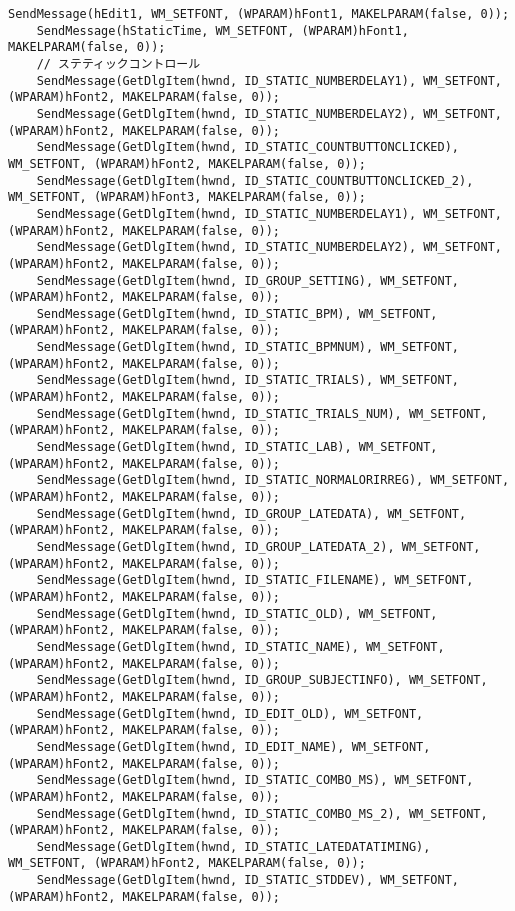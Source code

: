 \begin{lstlisting}[caption=main.cpp]
	SendMessage(hEdit1, WM_SETFONT, (WPARAM)hFont1, MAKELPARAM(false, 0));
	SendMessage(hStaticTime, WM_SETFONT, (WPARAM)hFont1, MAKELPARAM(false, 0));
	// ステティックコントロール
	SendMessage(GetDlgItem(hwnd, ID_STATIC_NUMBERDELAY1), WM_SETFONT, (WPARAM)hFont2, MAKELPARAM(false, 0));
	SendMessage(GetDlgItem(hwnd, ID_STATIC_NUMBERDELAY2), WM_SETFONT, (WPARAM)hFont2, MAKELPARAM(false, 0));
	SendMessage(GetDlgItem(hwnd, ID_STATIC_COUNTBUTTONCLICKED), WM_SETFONT, (WPARAM)hFont2, MAKELPARAM(false, 0));
	SendMessage(GetDlgItem(hwnd, ID_STATIC_COUNTBUTTONCLICKED_2), WM_SETFONT, (WPARAM)hFont3, MAKELPARAM(false, 0));
	SendMessage(GetDlgItem(hwnd, ID_STATIC_NUMBERDELAY1), WM_SETFONT, (WPARAM)hFont2, MAKELPARAM(false, 0));
	SendMessage(GetDlgItem(hwnd, ID_STATIC_NUMBERDELAY2), WM_SETFONT, (WPARAM)hFont2, MAKELPARAM(false, 0));
	SendMessage(GetDlgItem(hwnd, ID_GROUP_SETTING), WM_SETFONT, (WPARAM)hFont2, MAKELPARAM(false, 0));
	SendMessage(GetDlgItem(hwnd, ID_STATIC_BPM), WM_SETFONT, (WPARAM)hFont2, MAKELPARAM(false, 0));
	SendMessage(GetDlgItem(hwnd, ID_STATIC_BPMNUM), WM_SETFONT, (WPARAM)hFont2, MAKELPARAM(false, 0));
	SendMessage(GetDlgItem(hwnd, ID_STATIC_TRIALS), WM_SETFONT, (WPARAM)hFont2, MAKELPARAM(false, 0));
	SendMessage(GetDlgItem(hwnd, ID_STATIC_TRIALS_NUM), WM_SETFONT, (WPARAM)hFont2, MAKELPARAM(false, 0));
	SendMessage(GetDlgItem(hwnd, ID_STATIC_LAB), WM_SETFONT, (WPARAM)hFont2, MAKELPARAM(false, 0));
	SendMessage(GetDlgItem(hwnd, ID_STATIC_NORMALORIRREG), WM_SETFONT, (WPARAM)hFont2, MAKELPARAM(false, 0));
	SendMessage(GetDlgItem(hwnd, ID_GROUP_LATEDATA), WM_SETFONT, (WPARAM)hFont2, MAKELPARAM(false, 0));
	SendMessage(GetDlgItem(hwnd, ID_GROUP_LATEDATA_2), WM_SETFONT, (WPARAM)hFont2, MAKELPARAM(false, 0));
	SendMessage(GetDlgItem(hwnd, ID_STATIC_FILENAME), WM_SETFONT, (WPARAM)hFont2, MAKELPARAM(false, 0));
	SendMessage(GetDlgItem(hwnd, ID_STATIC_OLD), WM_SETFONT, (WPARAM)hFont2, MAKELPARAM(false, 0));
	SendMessage(GetDlgItem(hwnd, ID_STATIC_NAME), WM_SETFONT, (WPARAM)hFont2, MAKELPARAM(false, 0));
	SendMessage(GetDlgItem(hwnd, ID_GROUP_SUBJECTINFO), WM_SETFONT, (WPARAM)hFont2, MAKELPARAM(false, 0));
	SendMessage(GetDlgItem(hwnd, ID_EDIT_OLD), WM_SETFONT, (WPARAM)hFont2, MAKELPARAM(false, 0));
	SendMessage(GetDlgItem(hwnd, ID_EDIT_NAME), WM_SETFONT, (WPARAM)hFont2, MAKELPARAM(false, 0));
	SendMessage(GetDlgItem(hwnd, ID_STATIC_COMBO_MS), WM_SETFONT, (WPARAM)hFont2, MAKELPARAM(false, 0));
	SendMessage(GetDlgItem(hwnd, ID_STATIC_COMBO_MS_2), WM_SETFONT, (WPARAM)hFont2, MAKELPARAM(false, 0));
	SendMessage(GetDlgItem(hwnd, ID_STATIC_LATEDATATIMING), WM_SETFONT, (WPARAM)hFont2, MAKELPARAM(false, 0));
	SendMessage(GetDlgItem(hwnd, ID_STATIC_STDDEV), WM_SETFONT, (WPARAM)hFont2, MAKELPARAM(false, 0));


\end{lstlisting}
